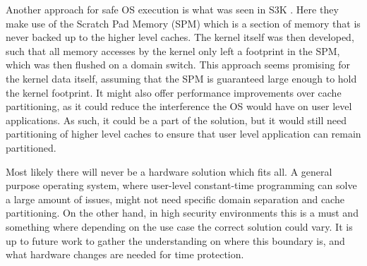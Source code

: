 Another approach for safe OS execution is what was seen in S3K
\cite{karlsson2025}. Here they make use of the Scratch Pad Memory (SPM) which
is a section of memory that is never backed up to the higher level caches. The
kernel itself was then developed, such that all memory accesses by the kernel
only left a footprint in the SPM, which was then flushed on a domain switch.
This approach seems promising for the kernel data itself, assuming that the SPM
is guaranteed large enough to hold the kernel footprint. It might also offer
performance improvements over cache partitioning, as it could reduce the
interference the OS would have on user level applications. As such, it could be
a part of the solution, but it would still need partitioning of higher level
caches to ensure that user level application can remain partitioned.

Most likely there will never be a hardware solution which fits all. A general
purpose operating system, where user-level constant-time programming can solve
a large amount of issues, might not need specific domain separation and cache
partitioning. On the other hand, in high security environments this is a must
and something where depending on the use case the correct solution could vary.
It is up to future work to gather the understanding on where this boundary is,
and what hardware changes are needed for time protection.
